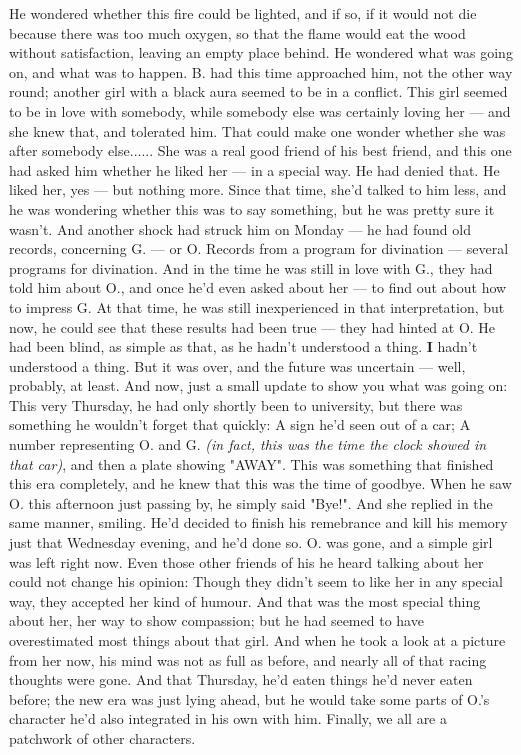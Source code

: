 He wondered whether this fire could be lighted, and if so, if it would not die because there was too much oxygen, so that the flame would eat the wood without satisfaction, leaving an empty place behind. 
He wondered what was going on, and what was to happen. 
B. had this time approached him, not the other way round; another girl with a black aura seemed to be in a conflict. This girl seemed to be in love with somebody, while somebody else was certainly loving her --- and she knew that, and tolerated him. That could make one wonder whether she was after somebody else......
She was a real good friend of his best friend, and this one had asked him whether he liked her --- in a special way. 
He had denied that. He liked her, yes --- but nothing more. 
Since that time, she'd talked to him less, and he was wondering whether this was to say something, but he was pretty sure it wasn't. 
And another shock had struck him on Monday --- he had found old records, concerning G. --- or O. Records from a program for divination --- several programs for divination. And in the time he was still in love with G., they had told him about O., and once he'd even asked about her --- to find out about how to impress G. 
At that time, he was still inexperienced in that interpretation, but now, he could see that these results had been true --- they had hinted at O. 
He had been blind, as simple as that, as he hadn't understood a thing. 
\textbf{I} hadn't understood a thing. 
But it was over, and the future was uncertain --- well, probably, at least. 
And now, just a small update to show you what was going on: This very Thursday, he had only shortly been to university, but there was something he wouldn't forget that quickly: A sign he'd seen out of a car; A number representing O. and G. \emph{(in fact, this was the time the clock showed in that car)}, and then a plate showing "AWAY". This was something that finished this era completely, and he knew that this was the time of goodbye. When he saw O. this afternoon just passing by, he simply said "Bye!". 
And she replied in the same manner, smiling. 
He'd decided to finish his remebrance and kill his memory just that Wednesday evening, and he'd done so. O. was gone, and a simple girl was left right now.
Even those other friends of his he heard talking about her could not change his opinion: Though they didn't seem to like her in any special way, they accepted her kind of humour. 
And that was the most special thing about her, her way to show compassion; but he had seemed to have overestimated most things about that girl. And when he took a look at a picture from her now, his mind was not as full as before, and nearly all of that racing thoughts were gone. And that Thursday, he'd eaten things he'd never eaten before; the new era was just lying ahead, but he would take some parts of O.'s character he'd also integrated in his own with him. Finally, we all are a patchwork of other characters. 
